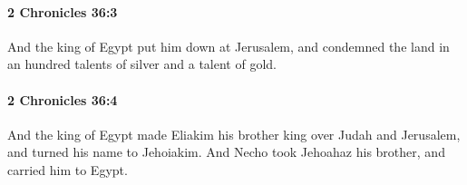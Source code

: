 		\paragraph{2 Chronicles 36:3} %
			\label{2CHRONICLES-36-3}

			And the king of Egypt put him down at Jerusalem, and condemned the land in an hundred talents of silver and a talent of gold.


		\paragraph{2 Chronicles 36:4} %
			\label{2CHRONICLES-36-4}

			And the king of Egypt made Eliakim his brother king over Judah and Jerusalem, and turned his name to Jehoiakim. And Necho took Jehoahaz his brother, and carried him to Egypt.


